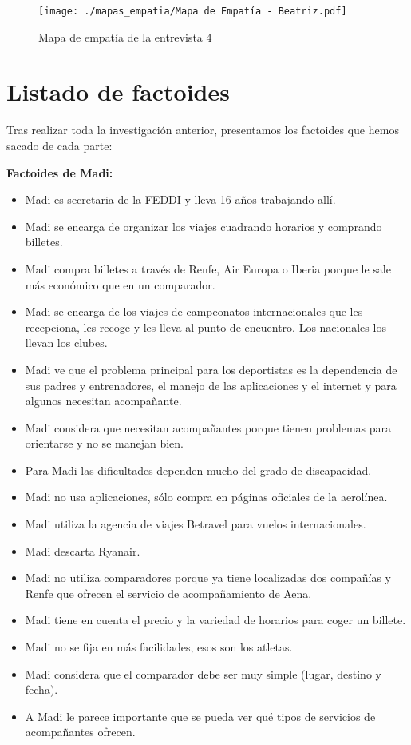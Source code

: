 \begin{figure}[H]
    \centering 
    \texttt{[image: ./mapas\_empatia/Mapa de Empatía - Beatriz.pdf]}
    \caption{Mapa de empatía de la entrevista 4}
    \label{fig:mapa_bea}
\end{figure}

\section{Listado de factoides}

Tras realizar toda la investigación anterior, presentamos los factoides que hemos sacado de cada parte:

\textbf{Factoides de Madi:}

\begin{itemize}
    \item Madi es secretaria de la FEDDI y lleva 16 años trabajando allí.
    \item Madi se encarga de organizar los viajes cuadrando horarios y comprando billetes.
    \item Madi compra billetes a través de Renfe, Air Europa o Iberia porque le sale más económico que en un comparador.
    \item Madi se encarga de los viajes de campeonatos internacionales que les recepciona, les recoge y les lleva al punto de encuentro. Los nacionales los llevan los clubes.
    \item Madi ve que el problema principal para los deportistas es la dependencia de sus padres y entrenadores, el manejo de las aplicaciones y el internet y para algunos necesitan acompañante.
    \item Madi considera que necesitan acompañantes porque tienen problemas para orientarse y no se manejan bien.
    \item Para Madi las dificultades dependen mucho del grado de discapacidad.
    \item Madi no usa aplicaciones, sólo compra en páginas oficiales de la aerolínea.
    \item Madi utiliza la agencia de viajes Betravel para vuelos internacionales.
    \item Madi descarta Ryanair.
    \item Madi no utiliza comparadores porque ya tiene localizadas dos compañías y Renfe que ofrecen el servicio de acompañamiento de Aena.
    \item Madi tiene en cuenta el precio y la variedad de horarios para coger un billete.
    \item Madi no se fija en más facilidades, esos son los atletas.
    \item Madi considera que el comparador debe ser muy simple (lugar, destino y fecha).
    \item A Madi le parece importante que se pueda ver qué tipos de servicios de acompañantes ofrecen.
\end{itemize}


